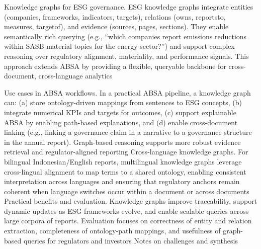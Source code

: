 Knowledge graphs for ESG governance. ESG knowledge graphs integrate entities (companies, frameworks, indicators, targets), relations (owns, reportsto, measures, targetof), and evidence (sources, pages, sections). They enable semantically rich querying (e.g., “which companies report emissions reductions within SASB material topics for the energy sector?”) and support complex reasoning over regulatory alignment, materiality, and performance signals. This approach extends ABSA by providing a flexible, queryable backbone for cross-document, cross-language analytics \cite{10.1145/3503044}

Use cases in ABSA workflows. In a practical ABSA pipeline, a knowledge graph can: (a) store ontology-driven mappings from sentences to ESG concepts, (b) integrate numerical KPIs and targets for outcomes, (c) support explainable ABSA by enabling path-based explanations, and (d) enable cross-document linking (e.g., linking a governance claim in a narrative to a governance structure in the annual report). Graph-based reasoning supports more robust evidence retrieval and regulator-aligned reporting \cite{10.1145/3503044}
Cross-language knowledge graphs. For bilingual Indonesian/English reports, multilingual knowledge graphs leverage cross-lingual alignment to map terms to a shared ontology, enabling consistent interpretation across languages and ensuring that regulatory anchors remain coherent when language switches occur within a document or across documents \cite{10.1016/j.inffus.2025.103073,10.1111/eufm.12509,10.48550/arxiv.2511.00024}
Practical benefits and evaluation. Knowledge graphs improve traceability, support dynamic updates as ESG frameworks evolve, and enable scalable queries across large corpora of reports. Evaluation focuses on correctness of entity and relation extraction, completeness of ontology-path mappings, and usefulness of graph-based queries for regulators and investors \cite{10.1145/3503044}
Notes on challenges and synthesis

